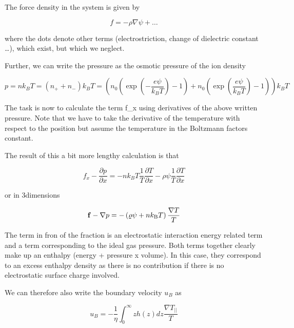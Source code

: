 \documentclass[letterpaper,10pt,english]{sphinxmanual}
\begin{document}
\sphinxAtStartPar
The force density in the system is given by

\sphinxAtStartPar
\begin{equation}
f=-\rho \nabla \psi + \ldots
\end{equation}

\sphinxAtStartPar
where the dots denote other terms (electrostriction, change of dielectric constant …), which exist, but which we neglect.

\sphinxAtStartPar
Further, we can write the pressure as the osmotic pressure of the ion density

\sphinxAtStartPar
\begin{equation}
p=n k_B T=(n_++n_-)k_B T=\left ( n_0(\exp\left (- \frac{e\psi}{k_B T}\right )-1)+ n_0(\exp\left ( \frac{e\psi}{k_B T}\right )-1) \right ) k_B T
\end{equation}

\sphinxAtStartPar
The task is now to calculate the term f\_x\sphinxhyphen{} using derivatives of the above written pressure. Note that we have to take the derivative of the temperature with respect to the position but assume the temperature in the Boltzmann factors constant.

\sphinxAtStartPar
The result of this a bit more lengthy calculation is that

\sphinxAtStartPar
\begin{equation}
f_x-\frac{\partial p}{\partial x} =-nk_B T \frac{1}{T}\frac{\partial T}{\partial x} - \rho \psi \frac{1}{T}\frac{\partial T}{\partial x}
\end{equation}

\sphinxAtStartPar
or in 3\sphinxhyphen{}dimensions

\sphinxAtStartPar
\begin{equation}
{\bf f}-\nabla p= -\left(\varrho \psi+n k_{\mathrm{B}} T\right) \frac{\nabla T}{T}
\end{equation}

\sphinxAtStartPar
The term in fron of the fraction is an electrostatic interaction energy related term and a term corresponding to the ideal gas pressure. Both terms together clearly make up an enthalpy (energy + pressure x volume). In this case, they correspond to an excess enthalpy density as there is no contribution if there is no electrostatic surface charge involved.

\sphinxAtStartPar
We can therefore also write the boundary velocity \(u_B\) as

\sphinxAtStartPar
\begin{equation}
u_B= -\frac{1}{\eta}\int_0^{\infty} z h(z)dz\frac{\nabla T_{||}}{T}
\end{equation}
\end{document}
